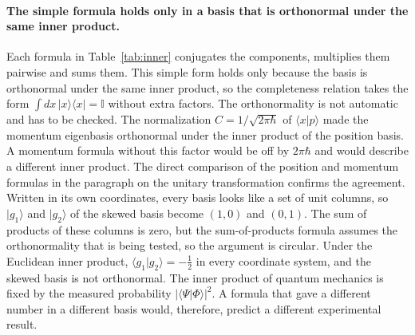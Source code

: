 \documentclass[11pt]{article}      %
\numberwithin{equation}{section}   %
\begin{document}
\paragraph{The simple formula holds only in a basis that is orthonormal under the same inner product.} Each formula in Table~\ref{tab:inner} conjugates the components, multiplies them pairwise and sums them. This simple form holds only because the basis is orthonormal under the same inner product, so the completeness relation takes the form $\int dx\, |x\rangle\langle x| = \mathbb{I}$ without extra factors. The orthonormality is not automatic and has to be checked. The normalization $C = 1/\sqrt{2\pi\hbar}$ of $\langle x | p \rangle$ made the momentum eigenbasis orthonormal under the inner product of the position basis. A momentum formula without this factor would be off by $2\pi\hbar$ and would describe a different inner product. The direct comparison of the position and momentum formulas in the paragraph on the unitary transformation confirms the agreement. Written in its own coordinates, every basis looks like a set of unit columns, so $|g_1\rangle$ and $|g_2\rangle$ of the skewed basis become $(1, 0)$ and $(0, 1)$. The sum of products of these columns is zero, but the sum-of-products formula assumes the orthonormality that is being tested, so the argument is circular. Under the Euclidean inner product, $\langle g_1 | g_2 \rangle = -\tfrac{1}{2}$ in every coordinate system, and the skewed basis is not orthonormal. The inner product of quantum mechanics is fixed by the measured probability $|\langle \Psi | \Phi \rangle|^2$. A formula that gave a different number in a different basis would, therefore, predict a different experimental result.
\end{document}
